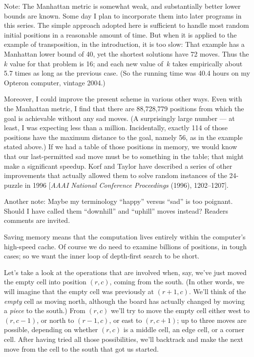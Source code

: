 Note: The Manhattan metric is somewhat weak, and substantially better
lower bounds are known. Some day I plan to incorporate them into
later programs in this series. The simple approach adopted here
is sufficient to handle most random initial positions in a reasonable
amount of time. But when it is applied to the example of transposition,
in the introduction, it is too slow: That example has a Manhattan
lower bound of 40, yet the shortest solutions have 72 moves. Thus
the $k$ value for that problem is 16; and each new value of~$k$
takes empirically about 5.7 times as long as the previous case.
(So the running time was 40.4 hours on my Opteron computer, vintage 2004.)

Moreover, I could improve the present scheme in various other ways.
Even with the Manhattan metric, I find that there are 88,728,779 positions
from which the goal is achievable without any sad moves. (A surprisingly
large number --- at least, I was expecting less than a million. Incidentally,
exactly 114 of those positions have the maximum distance to the goal,
namely 56, as in the example stated above.) If we had a
table of those positions in memory, we would know that our last-permitted
sad move must be to something in the table; that might make a
significant speedup. Korf and Taylor have described a series of
other improvements that actually
allowed them to solve random instances of the 24-puzzle in 1996
[{\sl AAAI National Conference Proceedings\/} (1996), 1202--1207].

Another note: Maybe my terminology ``happy'' versus ``sad'' is too
poignant. Should I have called them ``downhill'' and ``uphill'' moves
instead? Readers comments are invited.

\fi

Saving memory means that the computation lives
entirely within the
computer's high-speed cache. Of course we do need to examine billions
of positions, in tough cases; so we want the inner loop of depth-first
search to be short.

Let's take a look at the operations that are
involved when, say, we've just moved the empty cell into position
$(r,c)$, coming from the south. (In other words, we will
imagine that the empty cell was
previously at $(r+1,c)$. We'll think of the {\it empty\/} cell as moving north,
although the board has actually changed by moving a {\it piece\/} to the
south.)
From $(r,c)$ we'll try to move the empty cell either west to $(r,c-1)$,
or north to $(r-1,c)$, or east to $(r,c+1)$;
up to three moves are possible, depending on whether $(r,c)$ is a middle cell,
an edge cell, or a corner cell. After having tried all those possibilities,
we'll backtrack and make the next move from the cell to the south
that got us started.

